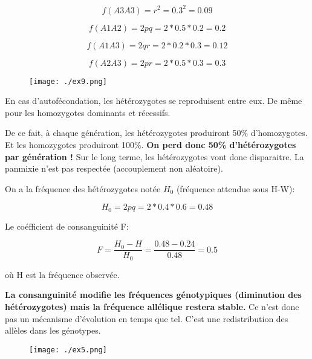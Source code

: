 \documentclass{article}
\begin{document}
\begin{equation}
f(A3A3) = r^2 = 0.3^2 = 0.09
\end{equation}

\begin{equation}
f(A1A2) = 2 pq = 2 * 0.5 * 0.2 = 0.2
\end{equation}

\begin{equation}
f(A1A3) = 2qr = 2 * 0.2 * 0.3 = 0.12
\end{equation}

\begin{equation}
f(A2A3) = 2pr = 2*0.5*0.3 = 0.3
\end{equation}


\begin{figure}[H]
\texttt{[image: ./ex9.png]}
\end{figure}

En cas d'autofécondation, les hétérozygotes se reproduisent entre eux. De même pour les homozygotes dominants et récessifs.

De ce fait, à chaque génération, les hétérozygotes produiront 50\% d'homozygotes. Et les homozygotes produiront 100\%. \textbf{On perd donc 50\% d'hétérozygotes par génération !} Sur le long terme, les hétérozygotes vont donc disparaitre. La panmixie n'est pas respectée (accouplement non aléatoire).

On a la fréquence des hétérozygotes notée $H_0$ (fréquence attendue sous H-W):

\begin{equation}
H_0 = 2 pq = 2 *0.4*0.6 = 0.48
\end{equation}

Le coéfficient de consanguinité F:

\begin{equation}
F = \frac{H_0-H}{H_0} = \frac{0.48 - 0.24}{0.48} = 0.5
\end{equation}

où H est la fréquence observée.

\textbf{La consanguinité modifie les fréquences génotypiques (diminution des hétérozygotes) mais la fréquence allélique restera stable.} Ce n'est donc pas un mécanisme d'évolution en temps que tel. C'est une redistribution des allèles dans les génotypes.



\begin{figure}[H]
\texttt{[image: ./ex5.png]}
\end{figure}
\end{document}
